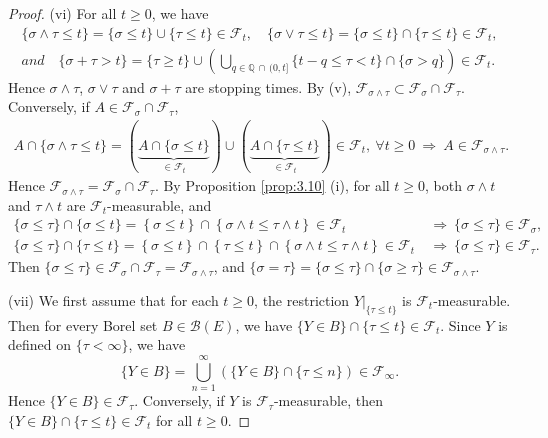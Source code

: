 \documentclass{article}
\numberwithin{equation}{section}
\theoremstyle{plain}
\theoremstyle{definition}
\begin{document}
\begin{proof}
\item (vi) For all $t\geq 0$, we have
\begin{align*}
	\{\sigma\wedge\tau\leq t\}=\{\sigma\leq t\}\cup\{\tau\leq t\}\in\mathscr{F}_t,\quad \{\sigma\vee\tau\leq t\}=\{\sigma\leq t\}\cap\{\tau\leq t\}\in\mathscr{F}_t,\\
	\textit{and}\quad \{\sigma+\tau>t\} = \{\tau\geq t\}\cup\left(\bigcup_{q\in\mathbb{Q}\,\cap\,(0,t]}\{t-q\leq\tau <t\}\cap\{\sigma>q\}\right)\in\mathscr{F}_t.
\end{align*}
Hence $\sigma\wedge\tau$, $\sigma\vee\tau$ and $\sigma+\tau$ are stopping times. By (v), $\mathscr{F}_{\sigma\wedge\tau}\subset\mathscr{F}_\sigma\cap\mathscr{F}_\tau$. Conversely, if $A\in\mathscr{F}_\sigma\cap\mathscr{F}_\tau$, 
\begin{align*}
	A\cap\{\sigma\wedge\tau\leq t\} = (\underbrace{A\cap\{\sigma\leq t\}}_{\in\mathscr{F}_t})\cup(\underbrace{A\cap\{\tau\leq t\}}_{\in\mathscr{F}_t}) \in\mathscr{F}_t,\ \forall t\geq 0\ \Rightarrow\ A\in\mathscr{F}_{\sigma\wedge\tau}.
\end{align*}
Hence $\mathscr{F}_{\sigma\wedge\tau}=\mathscr{F}_\sigma\cap\mathscr{F}_\tau$. By Proposition \ref{prop:3.10} (i), for all $t\geq 0$, both $\sigma\wedge t$ and $\tau\wedge t$ are $\mathscr{F}_t$-measurable, and
\begin{align*}
	\{\sigma\leq\tau\}\cap\{\sigma\leq t\} = \left\{\sigma\leq t\right\}\cap\left\{\sigma\wedge t\leq\tau\wedge t\right\}\in\mathscr{F}_t\ &\Rightarrow\ \{\sigma\leq\tau\}\in\mathscr{F}_\sigma,\\
	\{\sigma\leq\tau\}\cap\{\tau\leq t\} = \left\{\sigma\leq t\right\}\cap\left\{\tau\leq t\right\}\cap\left\{\sigma\wedge t\leq\tau\wedge t\right\}\in\mathscr{F}_t\ &\Rightarrow\ \{\sigma\leq\tau\}\in\mathscr{F}_\tau.
\end{align*}
Then $\{\sigma\leq\tau\}\in\mathscr{F}_\sigma\cap\mathscr{F}_\tau=\mathscr{F}_{\sigma\wedge\tau}$, and $\{\sigma=\tau\}=\{\sigma\leq\tau\}\cap\{\sigma\geq\tau\}\in\mathscr{F}_{\sigma\wedge\tau}$.

\item (vii) We first assume that for each $t\geq 0$, the restriction $Y|_{\{\tau\leq t\}}$ is $\mathscr{F}_t$-measurable. Then for every Borel set $B\in\mathscr{B}(E)$, we have $\{Y\in B\}\cap\{\tau\leq t\}\in\mathscr{F}_t$. Since $Y$ is defined on $\{\tau<\infty\}$, we have $$\{Y\in B\}=\bigcup_{n=1}^\infty\left(\{Y\in B\}\cap\{\tau\leq n\}\right)\in\mathscr{F}_\infty.$$
Hence $\{Y\in B\}\in\mathscr{F}_\tau$. Conversely, if $Y$ is $\mathscr{F}_\tau$-measurable, then $\{Y\in B\}\cap\{\tau\leq t\}\in\mathscr{F}_t$ for all $t\geq 0$.


\end{proof}
\end{document}
